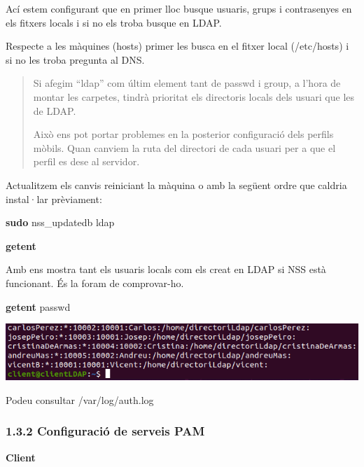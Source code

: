 \documentclass[
  12 pt,
  a4paper,
]{article}
\newenvironment{Shaded}{\begin{snugshade}}{\end{snugshade}}
\newcommand{\FunctionTok}[1]{\textcolor[rgb]{0.13,0.29,0.53}{\textbf{#1}}}
\newcommand{\NormalTok}[1]{#1}
\begin{document}
Ací estem configurant que en primer lloc busque usuaris, grups i
contrasenyes en els fitxers locals i si no els troba busque en LDAP.

Respecte a les màquines (hosts) primer les busca en el fitxer local
(/etc/hosts) i si no les troba pregunta al DNS.

\begin{quote}
Si afegim ``ldap'' com últim element tant de passwd i group, a l'hora de
montar les carpetes, tindrà prioritat els directoris locals dels usuari
que les de LDAP.

Això ens pot portar problemes en la posterior configuració dels perfils
mòbils. Quan canviem la ruta del directori de cada usuari per a que el
perfil es dese al servidor.
\end{quote}

Actualitzem els canvis reiniciant la màquina o amb la següent ordre que
caldria instal·lar prèviament:

\begin{Shaded}
\begin{Highlighting}[]
\FunctionTok{sudo}\NormalTok{ nss\_updatedb ldap}
\end{Highlighting}
\end{Shaded}

\textbf{getent}

Amb ens mostra tant els usuaris locals com els creat en LDAP si NSS està
funcionant. És la foram de comprovar-ho.

\begin{Shaded}
\begin{Highlighting}[]
\FunctionTok{getent}\NormalTok{ passwd}
\end{Highlighting}
\end{Shaded}

\includegraphics{png/libpam5.png}

Podeu consultar /var/log/auth.log

\subsubsection{1.3.2 Configuració de serveis
PAM}\label{configuraciuxf3-de-serveis-pam}

\textbf{Client}
\end{document}

